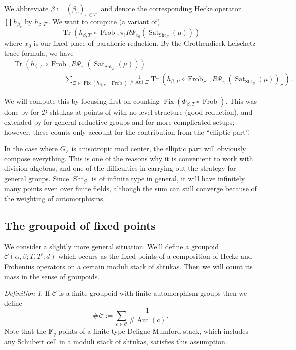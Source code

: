\documentclass[reqno]{amsart}
\numberwithin{equation}{section}
\newcommand{\F}{\mathbf{F}}
\newcommand{\Cal}[1]{\mathcal{#1}}
\DeclareMathOperator{\Frob}{Frob}
\DeclareMathOperator{\Tr}{Tr}
\DeclareMathOperator{\Aut}{Aut}
\DeclareMathOperator{\Fix}{Fix}
\DeclareMathOperator{\Sht}{Sht}
\DeclareMathOperator{\Sat}{Sat}
\theoremstyle{remark}
\newtheorem{defn}[thm]{Definition}
\numberwithin{equation}{section}
\begin{document}
We abbreviate $\beta := (\beta_v)_{v \in T'}$ and denote the corresponding Hecke operator $\prod h_{\beta_v}$ by $h_{\beta, T'}$. We want to compute (a variant of) 
\[
\Tr(h_{\beta, T'} \circ \Frob, \pi_! R\Psi_{x_0}(\Sat_{\Sht_{\Cal{G}}}(\mu))) 
 \]
where  $x_0$ is our fixed place of parahoric reduction. By the Grothendieck-Lefschetz trace formula, we have 
\begin{align*}	
&\Tr(h_{\beta, T'} \circ \Frob, R\Psi_{x_0}(\Sat_{\Sht_{\Cal{G}}}(\mu)))  \\
& \hspace{1in} = \sum_{\Xi\in \Fix(h_{\beta, T'} \circ \Frob)} \frac{1}{\# \Aut \Xi} \Tr(h_{\beta, T'} \circ \Frob_{\Xi}, R\Psi_{x_0}(\Sat_{\Sht_{\Cal{G}}}(\mu))_{\Xi} ).
\end{align*}

We will compute this by focusing first on counting $\Fix(\Phi_{\beta, T} \circ \Frob)$. This was done by \cite{Ngo06} for $\Cal{D}$-shtukas at points of with no level structure (good reduction), and extended by \cite{NgoNgo} for general reductive groups and \cite{Ngo13} for more complicated setups; however, these counts only account for the contribution from the ``elliptic part''. 

In the case where $G_F$ is anisotropic mod center, the elliptic part will obviously compose everything. This is one of the reasons why it is convenient to work with division algebras, and one of the difficulties in carrying out the strategy for general groups. Since $\Sht_{\Cal{G}}$ is of infinite type in general, it will have infinitely many points even over finite fields, although the sum can still converge because of the weighting of automorphisms. 

\subsection{The groupoid of fixed points}
We consider a slightly more general situation. We'll define a groupoid $\Cal{C}(\alpha,\beta; T,T'; d)$ which occurs as the fixed points of a composition of Hecke and Frobenius operators on a certain moduli stack of shtukas. Then we will count its mass in the sense of groupoids. 

\begin{defn}If $\Cal{C}$ is a finite groupoid with finite automorphism groups then we define 
\[
\# \Cal{C} := \sum_{c\in \Cal{C}} \frac{1}{\# \Aut(c)}.
\]
Note that the $\F_q$-points of a finite type Deligne-Mumford stack, which includes any Schubert cell in a moduli stack of shtukas, satisfies this assumption.
\end{defn}
\end{document}
